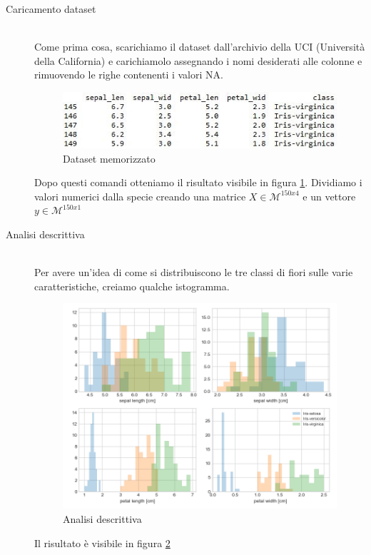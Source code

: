 \documentclass[12pt]{article}
\newcommand{\codice}[2]{}
\begin{document}
			\begin{description}

				\item[Caricamento dataset] \hfill \\
				Come prima cosa, scarichiamo il dataset dall'archivio della UCI (Università della California) e carichiamolo assegnando i nomi desiderati alle colonne e rimuovendo le righe contenenti i valori NA.
				
				
				
				\begin{figure}[H]
					\begin{center}
						\includegraphics[scale=.7]{tab}
						\caption{Dataset memorizzato}
						\label{fig:dataset}
					\end{center}
				\end{figure}
				
				Dopo questi comandi otteniamo il risultato visibile in figura \ref{fig:dataset}. Dividiamo i valori numerici dalla specie creando una matrice $X \in \mathcal{M}^{150x4}$ e un vettore $y \in \mathcal{M}^{150x1}$
				
				\codice{30}{32}
				
				\item[Analisi descrittiva] \hfill \\
				Per avere un'idea di come si distribuiscono le tre classi di fiori sulle varie caratteristiche, creiamo qualche istogramma.				
				\codice{37}{56}				
				\begin{figure}
					\begin{center}
						\includegraphics[scale=.5]{isto}
						\caption{Analisi descrittiva}
						\label{fig:isto}
					\end{center}
				\end{figure}				
				Il risultato è visibile in figura \ref{fig:isto}
							

\end{description}
\end{document}
